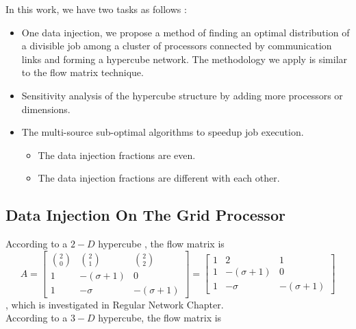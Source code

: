 In this work, we have two tasks as follows :
\begin{itemize}
\item One data injection, we propose a method of finding an optimal distribution of a divisible job among a cluster of processors connected by communication links and forming a hypercube network.  The methodology we apply is similar to the flow matrix technique.\\
\item Sensitivity analysis of the hypercube structure by adding more processors or dimensions.
\item The multi-source sub-optimal algorithms to speedup job execution.
\begin{itemize}
\item The data injection fractions are even.
\item The data injection fractions are different with each other.
\end{itemize}
\end{itemize}

\subsection{Data Injection On The Grid Processor}

According to a $2-D$ hypercube , the flow matrix is  
\begin{equation}
{
A = \left[ \begin{array}{ccc}
{2 \choose 0} & {2 \choose 1} & {2 \choose 2}\\
1 & -(\sigma + 1) & 0\\
1 & -\sigma & -(\sigma + 1)
\end{array} 
\right ]
=
\left[ \begin{array}{ccc}
1 & 2 & 1\\
1 & -(\sigma + 1) & 0\\
1 & -\sigma & -(\sigma + 1)
\end{array} 
\right ]
} 
\end{equation}
, which is investigated in Regular Network Chapter.\\

According to a $3-D$ hypercube, the flow matrix is \\

